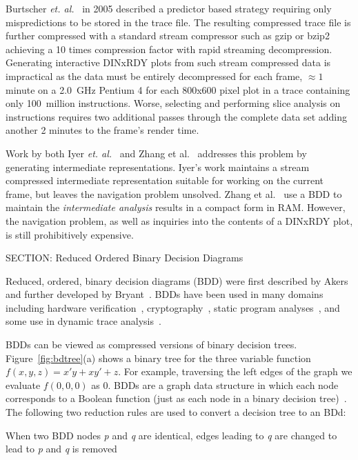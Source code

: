 {Burtscher \textit{et. al.}~\cite{burtscher:05:cgo} in 2005 described a predictor based strategy requiring only mispredictions to be stored in the trace file. The resulting compressed trace file is further compressed with a standard stream compressor such as gzip or bzip2 achieving a 10 times compression factor with rapid streaming decompression. Generating interactive DINxRDY plots from such stream compressed data is impractical as the data must be entirely decompressed for each frame, $\approx 1$ minute on a 2.0~GHz Pentium 4 for each 800x600 pixel plot in a trace containing only 100~million instructions.  Worse, selecting and performing slice analysis on instructions requires two additional passes through the complete data set adding another 2 minutes to the frame's render time.

Work by both Iyer \textit{et. al.}~\cite{iyer:05:epic} and Zhang et al.~\cite{zhang:04:icse} addresses this problem by generating intermediate representations. Iyer's work maintains a stream compressed intermediate representation suitable for working on the current frame, but leaves the navigation problem unsolved.  Zhang et al.~\cite{zhang:04:icse} use a BDD to maintain the \textit{intermediate analysis} results in a compact form in RAM. However, the navigation problem, as well as inquiries into the contents of a DINxRDY plot, is still prohibitively expensive.

SECTION: Reduced Ordered Binary Decision Diagrams


Reduced, ordered, binary decision diagrams (BDD) were first described by Akers~\cite{akers:78:itc} and further developed by Bryant~\cite{bryant:86:ieeetc}.  BDDs have been used in many domains including hardware verification~\cite{brayton:96:cav}, cryptography~\cite{krause:02:ec}, static program analyses~\cite{whaley:05:pods,whaley:04:pldi}, and some use in dynamic trace analysis~\cite{zhang:04:icse}.

BDDs can be viewed as compressed versions of binary decision trees. Figure~\ref{fig:bdtree}(a) shows a binary tree for the three variable function $f(x,y,z) = x'y + xy' + z$.  For example, traversing the left edges of the graph we evaluate $f(0,0,0)$ as $0$.  BDDs are a graph data structure in which each node corresponds to a Boolean function (just as each node in a binary decision tree)~\cite{bryant:86:ieeetc}. The following two reduction rules are used to convert a decision tree to an BDd:

 When two BDD nodes \textit{p} and \textit{q} are identical, edges
 leading to \textit{q} are changed to lead to \textit{p} and \textit{q} is removed

}
